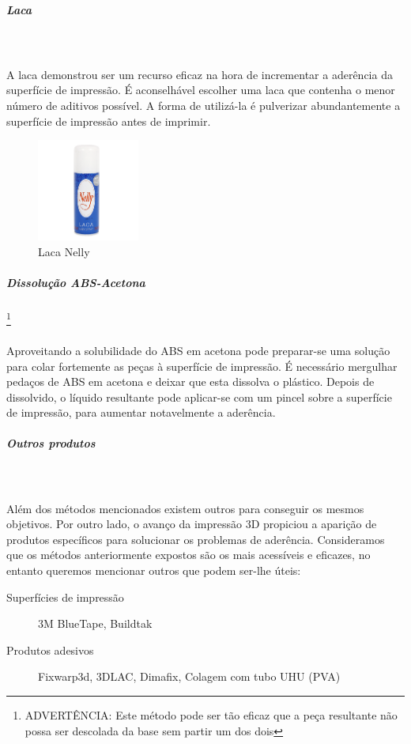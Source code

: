\documentclass[11pt,a4paper]{article}
\begin{document}
				\subparagraph{Laca}\mbox{}\\\\
A laca demonstrou ser um recurso eficaz na hora de incrementar a aderência da superfície de impressão. É aconselhável escolher uma laca que contenha o menor número de aditivos possível. A forma de utilizá-la é pulverizar abundantemente a superfície de impressão antes de imprimir.
\begin{figure}[H]
\centering
\includegraphics[width=0.3\textwidth,cfbox=azul_marcos 4pt 0pt]{FOTOS/LACA}
\caption*{Laca Nelly}
\end{figure}
				\subparagraph{Dissolução ABS-Acetona}\footnote{ADVERTÊNCIA: Este método pode ser tão eficaz que a peça resultante não possa ser descolada da base sem partir um dos dois} \mbox{}\\\\
Aproveitando a solubilidade do ABS em acetona pode preparar-se uma solução para colar fortemente as peças à superfície de impressão. É necessário mergulhar pedaços de ABS em acetona e deixar que esta dissolva o plástico. Depois de dissolvido, o líquido resultante pode aplicar-se com um pincel sobre a superfície de impressão, para aumentar notavelmente a aderência.
				\subparagraph{Outros produtos}\mbox{}\\\\
Além dos métodos mencionados existem outros para conseguir os mesmos objetivos. Por outro lado, o avanço da impressão 3D propiciou a aparição de produtos específicos para solucionar os problemas de aderência. Consideramos que os métodos anteriormente expostos são os mais acessíveis e eficazes, no entanto queremos mencionar outros que podem ser-lhe úteis:
\begin{description}
\item[Superfícies de impressão] 3M BlueTape, Buildtak
\item[Produtos adesivos] Fixwarp3d, 3DLAC, Dimafix, Colagem com tubo UHU (PVA)
\end{description}
\end{document}
